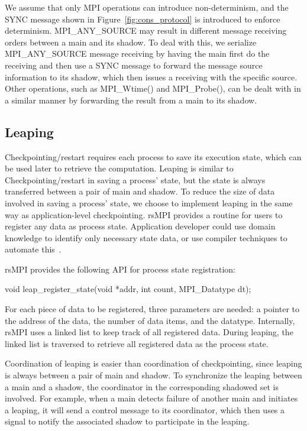 We assume that only MPI operations can introduce non-determinism, and the SYNC message shown in Figure~\ref{fig:cons_protocol} is introduced to enforce determinism. MPI\_ANY\_SOURCE may result in different message receiving orders between a main and its shadow. To deal with this, we serialize MPI\_ANY\_SOURCE message receiving by having the main first do the receiving and then use a SYNC message to forward the message source information to its shadow, which then issues a receiving with the specific source. Other operations, such as MPI\_Wtime() and MPI\_Probe(), can be dealt with in a similar manner by forwarding the result from a main to its shadow.


\subsection{Leaping}
Checkpointing/restart requires each process to save its execution state, which can be used later to retrieve the computation. Leaping is similar to Checkpointing/restart in saving a process' state, but the state is always transferred between a pair of main and shadow. 
To reduce the size of data involved in saving a process' state, we choose to implement leaping in the same way as application-level checkpointing. rsMPI provides a routine for users to register any data as process state. Application developer could use domain knowledge to identify only necessary state data, or use compiler techniques to automate this~\cite{5160999}. 

rsMPI provides the following API for process state registration:

void leap\_register\_state(void *addr, int count, MPI\_Datatype dt);

For each piece of data to be registered, three parameters are needed: a pointer to the address of the data, the number of data items, and the datatype. Internally, rsMPI uses a linked list to keep track of all registered data. %
During leaping, the linked list is traversed to retrieve all registered data as the process state.

Coordination of leaping is easier than coordination of checkpointing, since leaping is always between a pair of main and shadow. To synchronize the leaping between a main and a shadow, the coordinator in the corresponding shadowed set is involved. For example, when a main detects failure of another main and initiates a leaping, it will send a control message to its coordinator, which then uses a signal to notify the associated shadow to participate in the leaping. 

